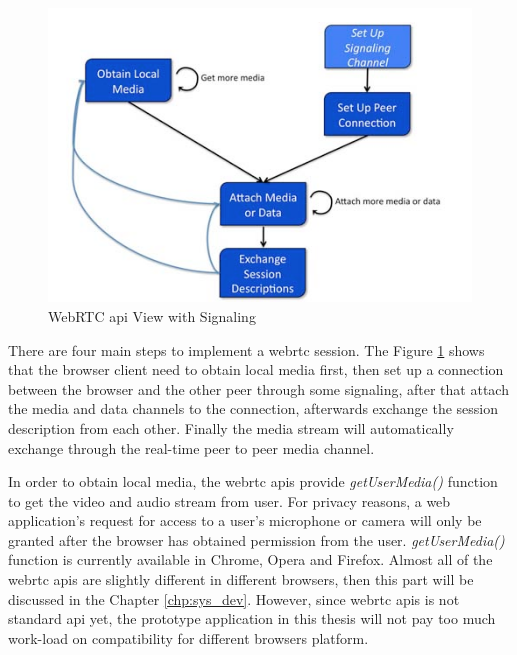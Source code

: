 \begin{figure}
	\centering
    	\includegraphics[width=0.50\textheight,natwidth=610,natheight=642]{figs/webrtcApis.png}
  	\caption{WebRTC \gls{api} View with Signaling\cite{inbook:rtc-apis}}
  	\label{fig:webrtc_4steps}
\end{figure}

\noindent There are four main steps to implement a \gls{webrtc} session. The Figure \ref{fig:webrtc_4steps} shows that the browser client need to obtain local media first, then set up a connection between the browser and the other peer through some signaling, after that attach the media and data channels to the connection, afterwards exchange the session description from each other. Finally the media stream will automatically exchange through the real-time peer to peer media channel.

\par In order to obtain local media, the \gls{webrtc} \gls{api}s provide \textit{getUserMedia()} function to get the video and audio stream from user. For privacy reasons, a web application’s request for access to a user’s microphone or camera will only be granted after the browser has obtained permission from the user. \textit{getUserMedia()} function is currently available in Chrome, Opera and Firefox. Almost all of the \gls{webrtc} \gls{api}s are slightly different in different browsers, then this part will be discussed in the Chapter \ref{chp:sys_dev}. However, since \gls{webrtc} \gls{api}s is not standard \gls{api} yet, the prototype application in this thesis will not pay too much work-load on compatibility for different browsers platform.

